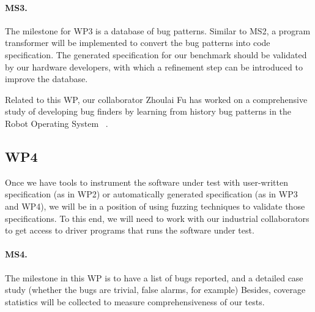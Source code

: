 \documentclass[fleqn,12pt]{article}
\begin{document}



\paragraph{MS3.} The milestone for WP3 is a database of bug patterns. Similar to MS2,
a program transformer will be implemented to convert the bug patterns
into code specification. The generated specification for our benchmark
should be validated by our hardware developers, with which a refinement
step can be introduced to improve the database.


Related to this WP, our collaborator Zhoulai Fu has worked on a comprehensive study of developing bug finders by learning from history bug patterns in the Robot Operating System~\cite{nielsenFSW2020dependencybugs} .



\subsection{WP4} Once we have tools to instrument the software under test with user-written
specification (as in WP2) or automatically generated specification (as
in WP3 and WP4), we will be in a position of using fuzzing techniques
to validate those specifications. To this end, we will need to work
with our industrial collaborators to get access to driver programs
that runs the software under test.

\paragraph{MS4.} The milestone in this WP is to have a list of bugs reported, and a detailed case study (whether the bugs are
trivial, false alarms, for example) Besides, coverage statistics will
be collected to measure comprehensiveness of our tests.


\end{document}

